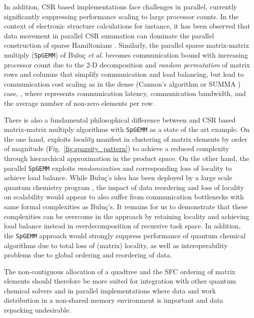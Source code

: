 In addition, CSR based implementations face challenges in parallel, currently
significantly suppressing performance scaling to large processor counts. In
the context of electronic structure calculations for instance, it has been
observed that data movement in parallel CSR summation can dominate the
parallel construction of sparse Hamiltonians \cite{10.1063/1.1568734}.
Similarly, the parallel sparse matrix-matrix multiply ({\tt SpGEMM}) of
Bulu\c{c} \emph{et al.} \cite{Buluc:2008:SpMM, buluc2011parallel} becomes
communication bound with increasing processor count due to the 2-D
decomposition and {\em random permutation} of matrix rows and columns that
simplify communication and load balancing, but lead to communication cost
scaling as in the dense (Cannon's algorithm \cite{cannon1969cellular} or SUMMA
\cite{van1997summa}) case, , where  represents communication latency,
 communication bandwidth, and  the average number of non-zero
elements per row.

There is also a fundamental philosophical difference between \SpAMM{} and CSR
based matrix-matrix multiply algorithms with {\tt SpGEMM} as a state of the
art example. On the one hand, \SpAMM{} exploits \emph{locality} manifest in
clustering of matrix elements by order of magnitude
(Fig.~\ref{fig:sparsity_pattern}) to achieve a reduced complexity through
hierarchical approximation in the product space. On the other hand, the
parallel {\tt SpGEMM} exploits \emph{randomization} and corresponding loss of
locality to achieve load balance. While Bulu\c{c}'s idea has been deployed by
a large scale quantum chemistry program \cite{VandeVondele2012}, the impact of
data reordering and loss of locality on scalability would appear to also
suffer from communication bottlenecks with same formal complexities as
Bulu\c{c}'s.  It remains for us to demonstrate that these complexities can be
overcome in the \SpAMM{} approach by retaining locality and achieving load
balance instead in overdecomposition of recursive task space.  In addition,
the {\tt SpGEMM} approach would strongly suppress performance of quantum
chemical algorithms due to total loss of (matrix) locality,  as well as
interoperability problems due to global ordering and reordering of data.

The non-contiguous allocation of a quadtree and the SFC ordering of matrix
elements should therefore be more suited for integration with other quantum
chemical solvers and in parallel implementations where data and work
distribution in a non-shared memory environment is important and data
repacking undesirable.

